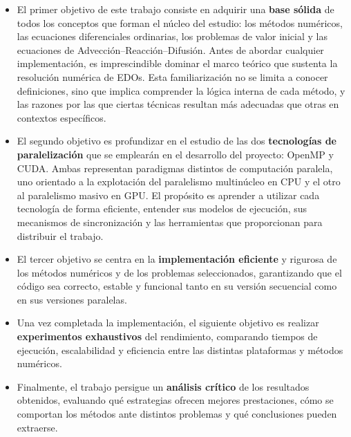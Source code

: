 \begin{itemize}
	\item El primer objetivo de este trabajo consiste en adquirir una \textbf{base sólida} de todos los conceptos que forman el núcleo del estudio: los métodos numéricos, las ecuaciones diferenciales ordinarias, los problemas de valor inicial y las ecuaciones de Advección–Reacción–Difusión. Antes de abordar cualquier implementación, es imprescindible dominar el marco teórico que sustenta la resolución numérica de EDOs. Esta familiarización no se limita a conocer definiciones, sino que implica comprender la lógica interna de cada método, y las razones por las que ciertas técnicas resultan más adecuadas que otras en contextos específicos.
	
	\item El segundo objetivo es profundizar en el estudio de las dos \textbf{tecnologías de paralelización} que se emplearán en el desarrollo del proyecto: OpenMP y CUDA. Ambas representan paradigmas distintos de computación paralela, uno orientado a la explotación del paralelismo multinúcleo en CPU y el otro al paralelismo masivo en GPU. El propósito es aprender a utilizar cada tecnología de forma eficiente, entender sus modelos de ejecución, sus mecanismos de sincronización y las herramientas que proporcionan para distribuir el trabajo. 
	
	\item El tercer objetivo se centra en la \textbf{implementación eficiente} y rigurosa de los métodos numéricos y de los problemas seleccionados, garantizando que el código sea correcto, estable y funcional tanto en su versión secuencial como en sus versiones paralelas. 
	
	\item Una vez completada la implementación, el siguiente objetivo es realizar \textbf{experimentos exhaustivos} del rendimiento, comparando tiempos de ejecución, escalabilidad y eficiencia entre las distintas plataformas y métodos numéricos. 
	
	\item Finalmente, el trabajo persigue un \textbf{análisis crítico} de los resultados obtenidos, evaluando qué estrategias ofrecen mejores prestaciones, cómo se comportan los métodos ante distintos problemas y qué conclusiones pueden extraerse.
\end{itemize}

